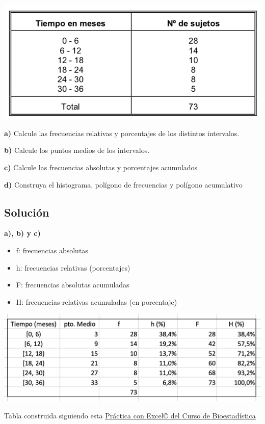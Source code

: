 \documentclass[
]{book}
\providecommand{\tightlist}{%
  \setlength{\itemsep}{0pt}\setlength{\parskip}{0pt}}
\begin{document}
\includegraphics[width=10.44in]{img/1_1}

\textbf{a)} Calcule las frecuencias relativas y porcentajes de los distintos intervalos.

\textbf{b)} Calcule los puntos medios de los intervalos.

\textbf{c)} Calcule las frecuencias absolutas y porcentajes acumulados

\textbf{d)} Construya el histograma, polígono de frecuencias y polígono acumulativo

\hypertarget{soluciuxf3n-3}{%
\subsection{Solución}\label{soluciuxf3n-3}}

\textbf{a), b) y c)}

\begin{itemize}
\tightlist
\item
  f: frecuencias absolutas
\item
  h: frecuencias relativas (porcentajes)
\item
  F: frecuencias absolutas acumuladas
\item
  H: frecuencias relativas acumuladas (en porcentaje)
\end{itemize}

\includegraphics[width=16.19in]{img/1_2}

Tabla construida siguiendo esta \href{https://1fjmanzano.github.io/bioestadistica/tablas-de-frecuencias.html\#tabla-de-frecuencias-pr\%C3\%A1ctica-con-excel}{Práctica con Excel© del Curso de Bioestadística}
\end{document}
